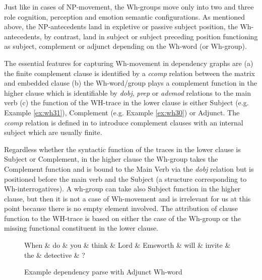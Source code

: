 
    Just like in cases of NP-movement, the Wh-groups move only into two and three role cognition, perception and emotion semantic configurations. As mentioned above, the NP-antecedents land in expletive or passive subject position, the Wh-antecedents, by contrast, land in subject or subject preceding position functioning as subject, complement or adjunct depending on the Wh-word (or Wh-group).

    The essential features for capturing Wh-movement in dependency graphs are (a) the finite complement clause is identified by a \textit{ccomp} relation between the matrix and embedded clause (b) the Wh-word/group plays a complement function in the higher clause which is identifiable by \textit{dobj}, \textit{prep} or \textit{advmod} relations to the main verb (c) the function of the WH-trace in the lower clause is either Subject (e.g. Example \ref{ex:wh31}), Complement (e.g. Example \ref{ex:wh30}) or Adjunct. 
    The \textit{ccomp} relation is defined in \cite{Marneffe2008} to introduce complement clauses with an internal subject which are usually finite. %

    Regardless whether the syntactic function of the traces in the lower clause is Subject or Complement, in the higher clause the Wh-group takes the Complement function and is bound to the Main Verb via the \textit{dobj} relation but is positioned before the main verb and the Subject (a structure corresponding to Wh-interrogatives). A wh-group can take also Subject function in the higher clause, but then it is not a case of Wh-movement and is irrelevant for us at this point because there is no empty element involved. The attribution of clause function to the WH-trace is based on either the case of the Wh-group or the missing functional constituent in the lower clause. 

    \begin{figure}[!ht]
    	\centering
    	\begin{dependency}
    		\begin{deptext}[]
    			When \& do \& you \& think \& Lord \& Emsworth \& will \& invite \& the \& detective \& ?\\
    		\end{deptext}
    	\end{dependency}
    	\caption{Example dependency parse with Adjunct Wh-word}
    	\label{fig:e22}
    \end{figure}

